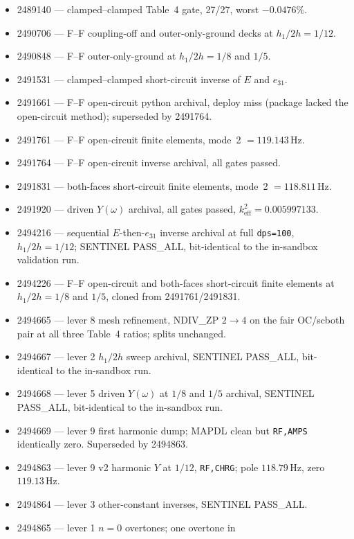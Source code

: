 \documentclass[11pt]{article}
\begin{document}
\begin{itemize}
\item 2489140 --- clamped--clamped Table~4 gate, 27/27, worst $-0.0476\%$.
\item 2490706 --- F--F coupling-off and outer-only-ground decks at
      $h_1/2h=1/12$.
\item 2490848 --- F--F outer-only-ground at $h_1/2h=1/8$ and $1/5$.
\item 2491531 --- clamped--clamped short-circuit inverse of $E$ and $e_{31}$.
\item 2491661 --- F--F open-circuit python archival, deploy miss
      (package lacked the open-circuit method); superseded by 2491764.
\item 2491761 --- F--F open-circuit finite elements, mode~2 $=119.143\,\mathrm{Hz}$.
\item 2491764 --- F--F open-circuit inverse archival, all gates passed.
\item 2491831 --- both-faces short-circuit finite elements, mode~2 $=118.811\,\mathrm{Hz}$.
\item 2491920 --- driven $Y(\omega)$ archival, all gates passed,
      $k_{\mathrm{eff}}^2=0.005997133$.
\item 2494216 --- sequential $E$-then-$e_{31}$ inverse archival at full
      \texttt{dps=100}, $h_1/2h=1/12$; SENTINEL PASS\_ALL, bit-identical
      to the in-sandbox validation run.
\item 2494226 --- F--F open-circuit and both-faces short-circuit finite
      elements at $h_1/2h=1/8$ and $1/5$, cloned from 2491761/2491831.
\item 2494665 --- lever 8 mesh refinement, NDIV\_ZP $2\to 4$ on the
      fair OC/scboth pair at all three Table~4 ratios; splits
      unchanged.
\item 2494667 --- lever 2 $h_1/2h$ sweep archival, SENTINEL PASS\_ALL,
      bit-identical to the in-sandbox run.
\item 2494668 --- lever 5 driven $Y(\omega)$ at $1/8$ and $1/5$
      archival, SENTINEL PASS\_ALL, bit-identical to the in-sandbox run.
\item 2494669 --- lever 9 first harmonic dump; MAPDL clean but
      \texttt{RF,AMPS} identically zero. Superseded by 2494863.
\item 2494863 --- lever 9 v2 harmonic $Y$ at $1/12$, \texttt{RF,CHRG};
      pole $118.79\,\mathrm{Hz}$, zero $119.13\,\mathrm{Hz}$.
\item 2494864 --- lever 3 other-constant inverses, SENTINEL PASS\_ALL.
\item 2494865 --- lever 1 $n=0$ overtones; one overtone in

\end{itemize}
\end{document}
